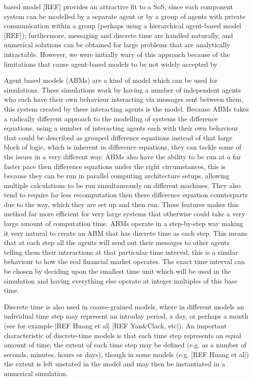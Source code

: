 \documentclass{article}
\begin{document}
based model [REF] provides an attractive fit to a SoS, since each component system can be modelled by a separate agent or by a group of agents with private communication within a group (perhaps using a hierarchical agent-based model [REF]); furthermore, messaging and discrete time are handled naturally, and numerical solutions can be obtained for large problems that are analytically intractable.  However, we were initially wary of this approach because of the limitations that cause agent-based models to be not widely accepted by 


Agent based models (ABMs) are a kind of model which can be used for simulations. These simulations work by having a number of independent agents who each have their own behaviour interacting via messages sent between them, this system created by these interacting agents is the model. 
Because ABMs takes a radically different approach to the modelling of systems the difference equations, using a number of interacting agents each with their own behaviour that could be described as grouped difference equations instead of that large block of logic, which is inherent in difference equations, they can tackle some of the issues in a very different way. 
ABMs also have the ability to be run at a far faster pace then difference equations under the right circumstances, this is because they can be run in parallel computing architecture setups, allowing multiple calculations to be run simultaneously on different machines. 
They also tend to require far less recomputation then there difference equation counterparts due to the way, which they are set up and then run.
These features makes this method far more efficient for very large systems that otherwise could take a very large amount of computation time.  
ABMs operate in a step-by-step way making it very natural to create an ABM that has discrete time as each step. This means that at each step all the agents will send out their messages to other agents telling them their interactions at that particular time interval, this is a similar behaviour to how the real financial market operates. The exact time interval can be chosen by deciding upon the smallest time unit which will be used in the simulation and having everything else operate at integer multiples of this base time.


Discrete time is also used in coarse-grained models, where in different models an individual time step may represent an intraday period, a day, or perhaps a month (see for example [REF Huang et al] [REF Yan&Clack, etc]).  An important characteristic of discrete-time models is that each time step represents an equal amount of time; the extent of each time step may be defined (e.g. as a number of seconds, minutes, hours or days), though in some models (e.g. [REF Huang et al]) the extent is left unstated in the model and may then be instantiated in a numerical simulation. 
\end{document}
